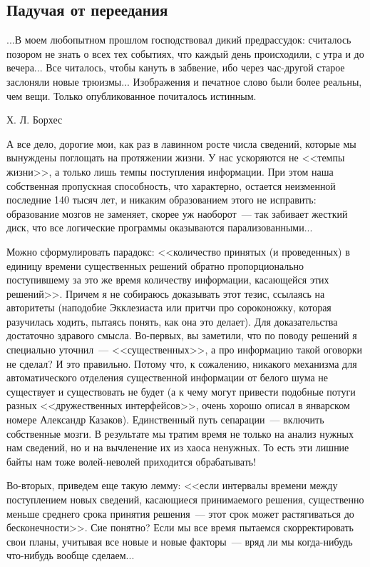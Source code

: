 \documentclass{scrbook}
\makeatletter
\newcommand{\bigepigraphwidth}{0.8} %
\newcommand{\defaultepigraphwidth}{0.5} %
\newcommand{\flqq}{<<}
\newcommand{\frqq}{>>}
\newcommand{\mdash}{~--- }
\newcommand{\essaysection}[1]{\subsection*{#1}\nopagebreak}
\newcommand{\myepigraph}[3][\@empty]{
	\ifx\@empty#1
		\setlength{\epigraphwidth}{\defaultepigraphwidth\textwidth}
	\else
		\setlength{\epigraphwidth}{#1\textwidth}
	\fi
	\epigraph{#2}{#3}
	\setlength{\epigraphwidth}{\defaultepigraphwidth\textwidth} %
	\nopagebreak
}
\makeatother
\begin{document}
\essaysection{Падучая от переедания}

\myepigraph[\bigepigraphwidth]{...В моем любопытном прошлом господствовал дикий предрассудок: считалось позором не знать о всех тех событиях, что каждый день происходили, с утра и до вечера... Все читалось, чтобы кануть в забвение, ибо через час-другой старое заслоняли новые трюизмы... Изображения и печатное слово были более реальны, чем вещи. Только опубликованное почиталось истинным.}
{Х. Л. Борхес}

А все дело, дорогие мои, как раз в лавинном росте числа сведений, которые мы вынуждены поглощать на протяжении жизни. У нас ускоряются не {\flqq}темпы жизни{\frqq}, а только лишь темпы поступления информации. При этом наша собственная пропускная способность, что характерно, остается неизменной последние 140 тысяч лет, и никаким образованием этого не исправить: образование мозгов не заменяет, скорее уж наоборот{\mdash}так забивает жесткий диск, что все логические программы оказываются парализованными...

Можно сформулировать парадокс: {\flqq}количество принятых (и проведенных) в единицу времени существенных решений обратно пропорционально поступившему за это же время количеству информации, касающейся этих решений{\frqq}. Причем я не собираюсь доказывать этот тезис, ссылаясь на авторитеты (наподобие Экклезиаста или притчи про сороконожку, которая разучилась ходить, пытаясь понять, как она это делает). Для доказательства достаточно здравого смысла. Во-первых, вы заметили, что по поводу решений я специально уточнил{\mdash}{\flqq}существенных{\frqq}, а про информацию такой оговорки не сделал? И это правильно. Потому что, к сожалению, никакого механизма для автоматического отделения существенной информации от белого шума не существует и существовать не будет (а к чему могут привести подобные потуги разных {\flqq}дружественных интерфейсов{\frqq}, очень хорошо описал в январском номере Александр Казаков). Единственный путь сепарации{\mdash}включить собственные мозги. В результате мы тратим время не только на анализ нужных нам сведений, но и на вычленение их из хаоса ненужных. То есть эти лишние байты нам тоже волей-неволей приходится обрабатывать!

Во-вторых, приведем еще такую лемму: {\flqq}если интервалы времени между поступлением новых сведений, касающиеся принимаемого решения, существенно меньше среднего срока принятия решения{\mdash}этот срок может растягиваться до бесконечности{\frqq}. Сие понятно? Если мы все время пытаемся скорректировать свои планы, учитывая все новые и новые факторы{\mdash}вряд ли мы когда-нибудь что-нибудь вообще сделаем...
\end{document}
